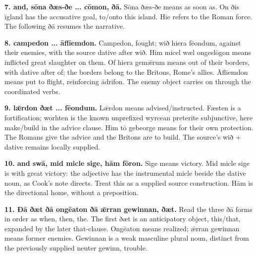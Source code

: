 \textbf{7. and, sōna ðæs-ðe ... cōmon, ðā.} Sōna ðæs-ðe means as soon as. On ðis īgland has the accusative goal, to/\allowbreak{}onto this island. Hīe refers to the Roman force. The following ðā resumes the narrative.

\textbf{8. campedon ... āflīemdon.} Campedon, fought; wið hiera fēondum, against their enemies, with the source dative after wið. Him micel wæl ongeslōgon means inflicted great slaughter on them. Of hiera gemǣrum means out of their borders, with dative after of; the borders belong to the Britons, Rome’s allies. Āflīemdon means put to flight, reinforcing ādrifon. The enemy object carries on through the coordinated verbs.

\textbf{9. lǣrdon ðæt ... fēondum.} Lǣrdon means advised/\allowbreak{}instructed. Fæsten is a fortification; worhten is the known unprefixed wyrcean preterite subjunctive, here make/\allowbreak{}build in the advice clause. Him tō gebeorge means for their own protection. The Romans give the advice and the Britons are to build. The source’s wið + dative remains locally supplied.

\textbf{10. and swā, mid micle sige, hām fōron.} Sige means victory. Mid micle sige is with great victory: the adjective has the instrumental micle beside the dative noun, as Cook’s note directs. Treat this as a supplied source construction. Hām is the directional home, without a preposition.

\textbf{11. Ðā ðæt ðā ongēaton ðā ǣrran gewinnan, ðæt.} Read the three ðā forms in order as when, then, the. The first ðæt is an anticipatory object, this/\allowbreak{}that, expanded by the later that-clause. Ongēaton means realized; ǣrran gewinnan means former enemies. Gewinnan is a weak masculine plural noun, distinct from the previously supplied neuter gewinn, trouble.

